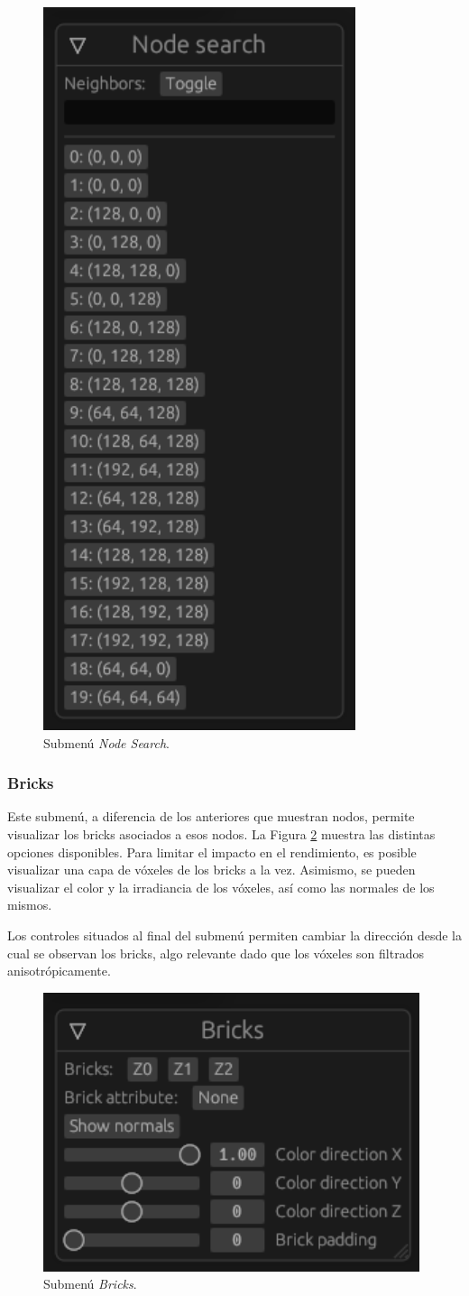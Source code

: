 \begin{figure}[h]
    \centering
    \includegraphics[width=.5\textwidth]{node_search.png}
    \caption{Submenú \textit{Node Search}.}
    \label{fig:node_search}
\end{figure}

\subsubsection{Bricks}

Este submenú, a diferencia de los anteriores que muestran nodos, permite visualizar los bricks asociados a esos nodos. La Figura \ref{fig:bricks} muestra las distintas opciones disponibles. Para limitar el impacto en el rendimiento, es posible visualizar una capa de vóxeles de los bricks a la vez. Asimismo, se pueden visualizar el color y la irradiancia de los vóxeles, así como las normales de los mismos.

Los controles situados al final del submenú permiten cambiar la dirección desde la cual se observan los bricks, algo relevante dado que los vóxeles son filtrados anisotrópicamente.

\begin{figure}[h]
    \centering
    \includegraphics[width=.5\textwidth]{bricks.png}
    \caption{Submenú \textit{Bricks}.}
    \label{fig:bricks}
\end{figure}

